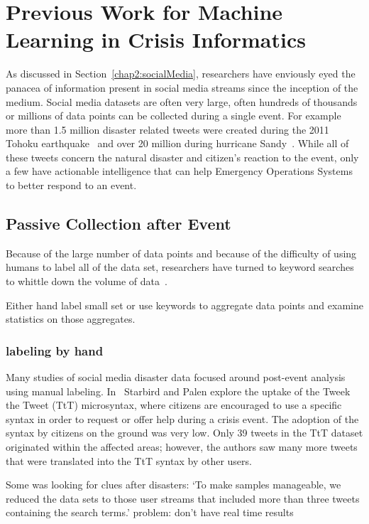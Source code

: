 \chapter{Previous Work for Machine Learning in Crisis Informatics}

As discussed in Section~\ref{chap2:socialMedia}, researchers have enviously eyed
the panacea of information present in social media streams since the inception
of the medium. Social media datasets are often very large, often hundreds of
thousands or millions of data points can be collected during a single event. For
example more than 1.5 million disaster related tweets were created during the
2011 Tohoku earthquake~\cite{doanAnalysisTwitterMessages2012} and over 20
million during hurricane Sandy~\cite{meierDigitalHumanitariansHow2015}. While
all of these tweets concern the natural disaster and citizen's reaction to the
event, only a few have actionable intelligence that can help Emergency
Operations Systems to better respond to an event.

\section{Passive Collection after Event}
Because of the large number of data points and because of the difficulty of
using humans to label all of the data set, researchers have turned to keyword
searches to whittle down the volume of
data~\cite{doanAnalysisTwitterMessages2012}.

Either hand label small set or use keywords to aggregate data points and examine
statistics on those aggregates.



\subsection{labeling by hand}
Many studies of social media disaster data focused around post-event analysis
using manual labeling. In~\cite{starbirdVoluntweetersSelforganizingDigital}
Starbird and Palen explore the uptake of the Tweek the Tweet (TtT) microsyntax, where
citizens are encouraged to use a specific syntax in order to request or offer
help during a crisis event. The adoption of the syntax by citizens on the ground
was very low. Only 39 tweets in the TtT dataset originated within the affected
areas; however, the authors saw many more tweets that were translated into the
TtT syntax by other users.

Some was looking for clues after disasters:
`To make samples manageable, we reduced the data sets to
those user streams that included more than three tweets
containing the search terms.'
\cite{viewegMicrobloggingTwoNatural2010}
problem: don't have real time results


